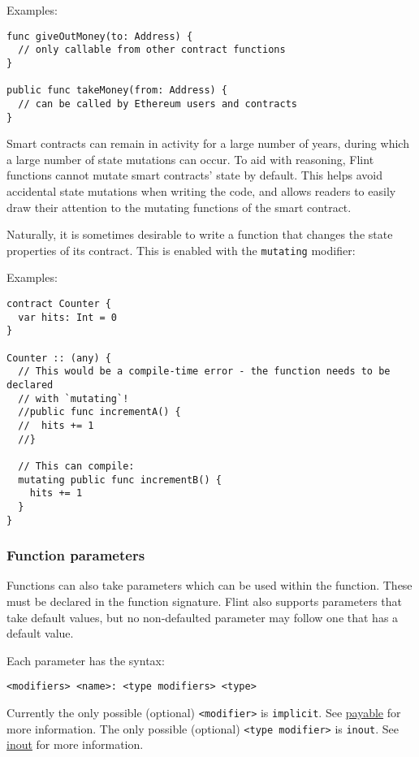 Examples:

\begin{verbatim}
func giveOutMoney(to: Address) {
  // only callable from other contract functions
}

public func takeMoney(from: Address) {
  // can be called by Ethereum users and contracts
}
\end{verbatim}

Smart contracts can remain in activity for a large number of years, during which a large number of state mutations can occur. To aid with reasoning, Flint functions cannot mutate smart contracts’ state by default. This helps avoid accidental state mutations when writing the code, and allows readers to easily draw their attention to the mutating functions of the smart contract.

Naturally, it is sometimes desirable to write a function that changes the state properties of its contract. This is enabled with the \texttt{mutating} modifier:

Examples:

\begin{verbatim}
contract Counter {
  var hits: Int = 0
}

Counter :: (any) {
  // This would be a compile-time error - the function needs to be declared
  // with `mutating`!
  //public func incrementA() {
  //  hits += 1
  //}

  // This can compile:
  mutating public func incrementB() {
    hits += 1
  }
}
\end{verbatim}

\subsubsection{Function parameters}
\label{sec:appendix-b-function-parameters}

Functions can also take parameters which can be used within the function. These must be declared in the function signature. Flint also supports parameters that take default values, but no non-defaulted parameter may follow one that has a default value.

Each parameter has the syntax:

\begin{verbatim}
<modifiers> <name>: <type modifiers> <type>
\end{verbatim}

Currently the only possible (optional) \texttt{<modifier>} is \texttt{implicit}. See \hyperref[sec:appendix-b-payable]{payable} for more information. The only possible (optional) \texttt{<type modifier>} is \texttt{inout}. See \hyperref[sec:appendix-b-structs-as-function-arguments]{inout} for more information.

